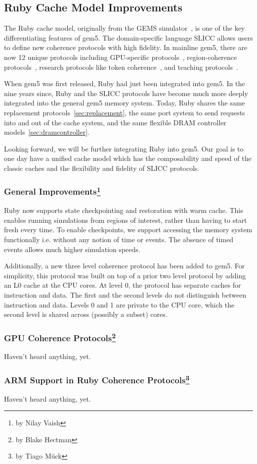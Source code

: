 \subsection[Ruby Cache Model Improvements]{Ruby Cache Model Improvements}
\label{sec:ruby}

The Ruby cache model, originally from the GEMS simulator~\cite{}, is one of the key differentiating features of gem5.
The domain-specific language SLICC allows users to define new coherence protocols with high fidelity.
In mainline gem5, there are now 12 unique protocols including GPU-specific protocols~\cite{viper}, region-coherence protocols~\cite{Power2012hsc}, research protocols like token coherence~\cite{token-coherence}, and teaching protocols~\cite{coherence-primer}.

When gem5 was first released, Ruby had just been integrated into gem5.
In the nine years since, Ruby and the SLICC protocols have become much more deeply integrated into the general gem5 memory system.
Today, Ruby shares the same replacement protocols~\ref{sec:replacement}, the same port system to send requests into and out of the cache system, and the same flexible DRAM controller models~\ref{sec:dramcontroller}.

Looking forward, we will be further integrating Ruby into gem5.
Our goal is to one day have a unified cache model which has the composability and speed of the classic caches and the flexibility and fidelity of SLICC protocols.

\subsubsection[General Improvements]{General Improvements\footnote{by Nilay Vaish}}

Ruby now supports state checkpointing and restoration with warm cache.
This enables running simulations from regions of interest, rather than having to start fresh every time.
To enable checkpoints, we support accessing the memory system functionally i.e. without any notion of time or events.
The absence of timed events allows much higher simulation speeds.

Additionally, a new three level coherence protocol has been added to gem5.
For simplicity, this protocol was built on top of a prior two level protocol by adding an L0 cache at the CPU cores.
At level 0, the protocol has separate caches for instruction and data.
The first and the second levels do not distinguish between instruction and data.
Levels 0 and 1 are private to the CPU core, which the second level is shared across (possibly a subset) cores.

\subsubsection[GPU Coherence Protocols]{GPU Coherence Protocols\footnote{by Blake Hectman}}

Haven't heard anything, yet.

\subsubsection[ARM Support and Extensions]{ARM Support in Ruby Coherence Protocols\footnote{by Tiago M{\"u}ck}}

Haven't heard anything, yet.
